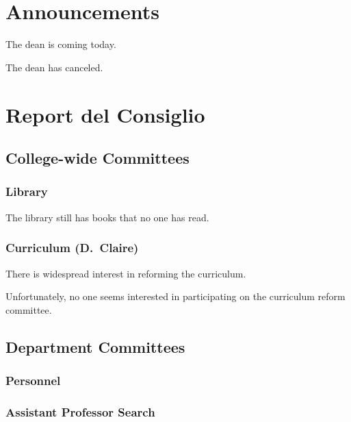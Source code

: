 \documentclass[11pt]{meetingmins}
\begin{document}
\maketitle
\section{Announcements} 
\begin{hiddenitems}
\item
The dean is coming today.
\item
The dean has canceled.
\end{hiddenitems}

\section{Report del Consiglio}

\subsection{College-wide Committees} 
\subsubsection{Library}
The library still has books that no one has read.

\subsubsection{Curriculum {\rm (D.~Claire)}} 

\begin{hiddensubitems}
\item
There is widespread interest in reforming the curriculum.


\item
Unfortunately, no one seems interested in participating on the curriculum reform committee.
\end{hiddensubitems}

\subsection{Department Committees}
\subsubsection{Personnel}
\subsubsection{Assistant Professor Search}
\end{document}
